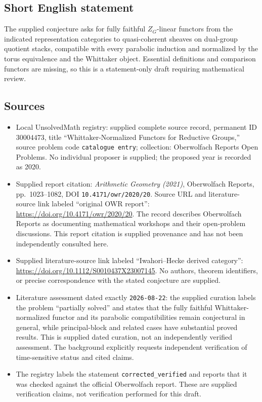 \documentclass[11pt]{article}
\begin{document}
\subsection{Short English statement}
The supplied conjecture asks for fully faithful $Z_G$-linear functors from the indicated representation categories to quasi-coherent sheaves on dual-group quotient stacks, compatible with every parabolic induction and normalized by the torus equivalence and the Whittaker object. Essential definitions and comparison functors are missing, so this is a statement-only draft requiring mathematical review.
\subsection{Sources}
\begin{itemize}
\item Local UnsolvedMath registry: supplied complete source record, permanent ID $30004473$, title ``Whittaker-Normalized Functors for Reductive Groups,'' source problem code \texttt{catalogue entry}; collection: Oberwolfach Reports Open Problems. No individual proposer is supplied; the proposed year is recorded as 2020.
\item Supplied report citation: \emph{Arithmetic Geometry (2021)}, Oberwolfach Reports, pp.\ 1023--1082, DOI \texttt{10.4171/owr/2020/20}. Source URL and literature-source link labeled ``original OWR report'': \url{https://doi.org/10.4171/owr/2020/20}. The record describes Oberwolfach Reports as documenting mathematical workshops and their open-problem discussions. This report citation is supplied provenance and has not been independently consulted here.
\item Supplied literature-source link labeled ``Iwahori--Hecke derived category'': \url{https://doi.org/10.1112/S0010437X23007145}. No authors, theorem identifiers, or precise correspondence with the stated conjecture are supplied.
\item Literature assessment dated exactly \texttt{2026-08-22}: the supplied curation labels the problem ``partially solved'' and states that the fully faithful Whittaker-normalized functor and its parabolic compatibilities remain conjectural in general, while principal-block and related cases have substantial proved results. This is supplied dated curation, not an independently verified assessment. The background explicitly requests independent verification of time-sensitive status and cited claims.
\item The registry labels the statement \texttt{corrected\_verified} and reports that it was checked against the official Oberwolfach report. These are supplied verification claims, not verification performed for this draft.
\end{itemize}
\end{document}
